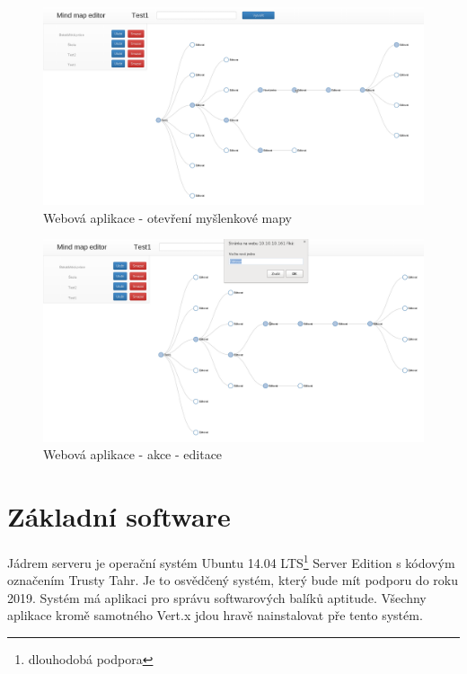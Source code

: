 \begin{figure}
\begin{centering}
\includegraphics[width	=1\textwidth]{obrazky/mindmap2}
\par\end{centering}
\caption{Webová aplikace - otevření myšlenkové mapy\label{fig:midnmap2}}
\end{figure}

\begin{figure}
\begin{centering}
\includegraphics[width	=1\textwidth]{obrazky/mindmap3}
\par\end{centering}
\caption{Webová aplikace - akce - editace\label{fig:midnmap3}}
\end{figure}

\section{Základní software}

Jádrem serveru je operační systém Ubuntu\cite{ubuntu} 14.04 LTS\footnote{dlouhodobá podpora} Server Edition s kódovým označením 
Trusty Tahr. Je to osvědčený systém, který bude mít podporu do roku 2019. Systém má aplikaci pro správu softwarových balíků 
aptitude. Všechny aplikace kromě samotného Vert.x jdou hravě nainstalovat pře tento systém.

